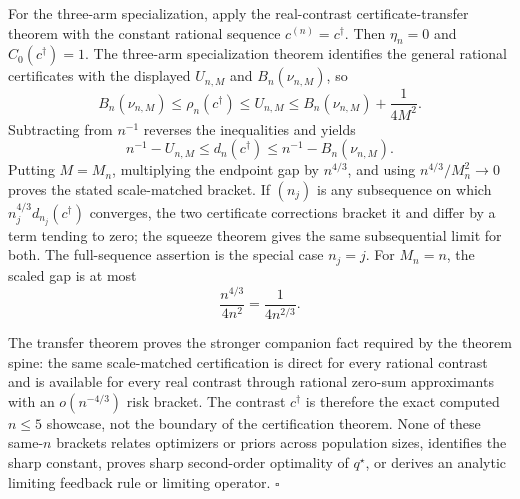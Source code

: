 For the three-arm specialization, apply the real-contrast certificate-transfer theorem with the constant rational sequence \(c^{(n)}=c^\dagger\).  Then \(\eta_n=0\) and \(C_0(c^\dagger)=1\).  The three-arm specialization theorem identifies the general rational certificates with the displayed \(U_{n,M}\) and \(B_n(\nu_{n,M})\), so
\[
 B_n(\nu_{n,M})\leq\rho_n(c^\dagger)\leq U_{n,M}
 \leq B_n(\nu_{n,M})+\frac1{4M^2}.
\]
Subtracting from \(n^{-1}\) reverses the inequalities and yields
\[
 n^{-1}-U_{n,M}
 \leq d_n(c^\dagger)
 \leq n^{-1}-B_n(\nu_{n,M}).
\]
Putting \(M=M_n\), multiplying the endpoint gap by \(n^{4/3}\), and using \(n^{4/3}/M_n^2\to0\) proves the stated scale-matched bracket.  If \((n_j)\) is any subsequence on which \(n_j^{4/3}d_{n_j}(c^\dagger)\) converges, the two certificate corrections bracket it and differ by a term tending to zero; the squeeze theorem gives the same subsequential limit for both.  The full-sequence assertion is the special case \(n_j=j\).  For \(M_n=n\), the scaled gap is at most
\[
 \frac{n^{4/3}}{4n^2}=\frac1{4n^{2/3}}.
\]

The transfer theorem proves the stronger companion fact required by the theorem spine: the same scale-matched certification is direct for every rational contrast and is available for every real contrast through rational zero-sum approximants with an \(o(n^{-4/3})\) risk bracket.  The contrast \(c^\dagger\) is therefore the exact computed \(n\leq5\) showcase, not the boundary of the certification theorem.  None of these same-\(n\) brackets relates optimizers or priors across population sizes, identifies the sharp constant, proves sharp second-order optimality of \(q^\star\), or derives an analytic limiting feedback rule or limiting operator. \(\square\)
